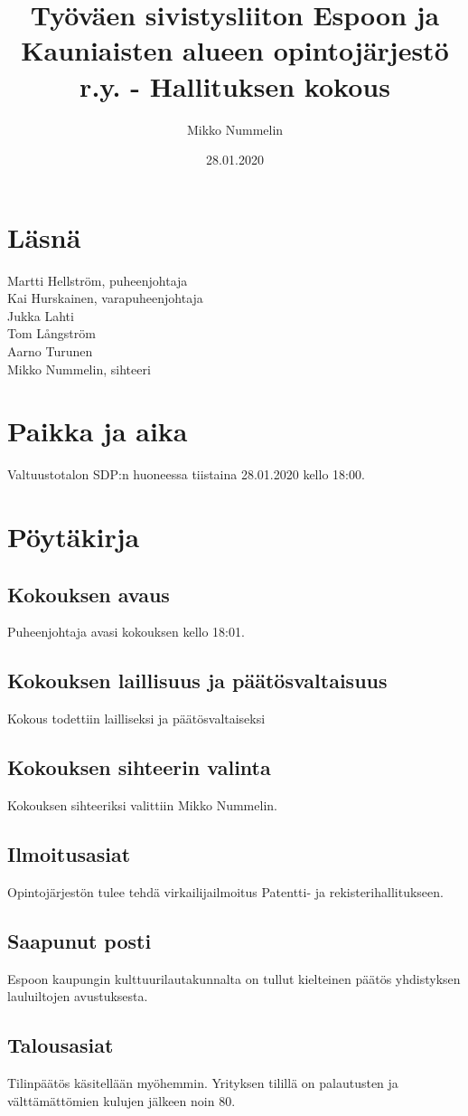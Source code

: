 \documentclass[a4paper]{amsart}
\title{Työväen sivistysliiton Espoon ja Kauniaisten alueen opintojärjestö r.y. - Hallituksen kokous}
\author{Mikko Nummelin}
\date{28.01.2020}
\begin{document}
\maketitle
\tableofcontents
\section*{Läsnä}
\begin{flushleft}
Martti Hellström, puheenjohtaja \\
Kai Hurskainen, varapuheenjohtaja \\
Jukka Lahti \\
Tom Långström \\
Aarno Turunen \\
Mikko Nummelin, sihteeri
\end{flushleft}
\section*{Paikka ja aika}
Valtuustotalon SDP:n huoneessa tiistaina 28.01.2020 kello 18:00.
\section{Pöytäkirja}
\subsection{Kokouksen avaus}
Puheenjohtaja avasi kokouksen kello 18:01.
\subsection{Kokouksen laillisuus ja päätösvaltaisuus}
Kokous todettiin lailliseksi ja päätösvaltaiseksi
\subsection{Kokouksen sihteerin valinta}
Kokouksen sihteeriksi valittiin Mikko Nummelin.
\subsection{Ilmoitusasiat}
Opintojärjestön tulee tehdä virkailijailmoitus Patentti- ja rekisterihallitukseen.
\subsection{Saapunut posti}
Espoon kaupungin kulttuurilautakunnalta on tullut kielteinen päätös yhdistyksen lauluiltojen avustuksesta.
\subsection{Talousasiat}
Tilinpäätös käsitellään myöhemmin. Yrityksen tilillä on palautusten ja välttämättömien kulujen jälkeen noin 80\EUR{}.
\end{document}
